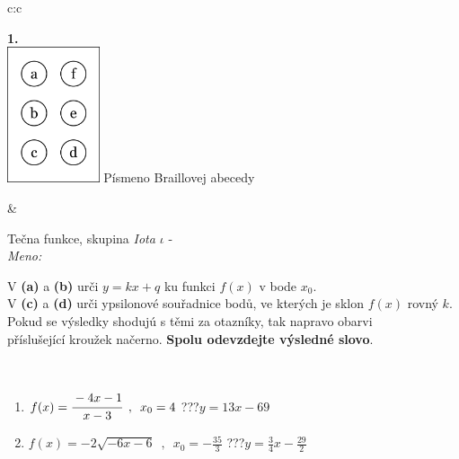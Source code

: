 \documentclass[10pt]{report}
\begin{document}
\begin{tabular}{c:c}
\begin{minipage}[c][104.5mm][t]{0.5\linewidth}
\begin{center}
\begin{minipage}{0.20\linewidth}
\begin{center}
{\Huge\bfseries 1.} \\[2mm]
\includegraphics[height=40mm]{../images/braille.png}
{\small Písmeno Braillovej abecedy}
\end{center}
\end{minipage}
\end{center}
\end{minipage}
&
\begin{minipage}[c][104.5mm][t]{0.5\linewidth}
\begin{center}
\vspace{7mm}
{\huge Tečna funkce, skupina \textit{Iota $\iota$} -}\\[5mm]
\textit{Meno:}\phantom{xxxxxxxxxxxxxxxxxxxxxxxxxxxxxxxxxxxxxxxxxxxxxxxxxxxxxxxxxxxxxxxxx}\\[5mm]
\begin{minipage}{0.95\linewidth}
\begin{center}
V \textbf{(a)} a \textbf{(b)} urči  $y = kx + q$ ku funkci $f(x)$ v bode $x_0$.\\V \textbf{(c)} a \textbf{(d)} urči ypsilonové souřadnice bodů, ve kterých je sklon $f(x)$ rovný $k$.\\Pokud se výsledky shodujú s těmi za otazníky, tak napravo obarvi\\příslušející kroužek načerno. \textbf{Spolu odevzdejte výsledné slovo}.
\end{center}
\end{minipage}
\\[1mm]
\begin{minipage}{0.79\linewidth}
\begin{center}
\begin{varwidth}{\linewidth}
\begin{enumerate}
\small
\item $f(x)=\cfrac{-4x-1}{x-3}\enspace , \enspace x_0=4$\quad \dotfill\; ???\;\dotfill \quad $y = 13x-69$
\item $f(x)=-2\sqrt{-6x-6}\enspace , \enspace x_0=-\frac{35}{3}$\quad \dotfill\; ???\;\dotfill \quad $y = \frac{3}{4}x-\frac{29}{2}$

\end{enumerate}
\end{varwidth}
\end{center}
\end{minipage}
\end{center}
\end{minipage}
\end{tabular}
\end{document}

